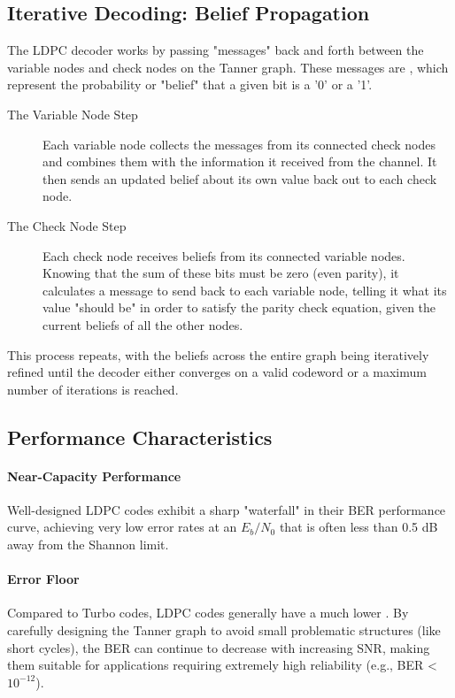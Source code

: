 \subsection{Iterative Decoding: Belief Propagation}

The LDPC decoder works by passing "messages" back and forth between the variable nodes and check nodes on the Tanner graph. These messages are , which represent the probability or "belief" that a given bit is a '0' or a '1'.
\begin{description}
    \item[The Variable Node Step] Each variable node collects the messages from its connected check nodes and combines them with the information it received from the channel. It then sends an updated belief about its own value back out to each check node.
    \item[The Check Node Step] Each check node receives beliefs from its connected variable nodes. Knowing that the sum of these bits must be zero (even parity), it calculates a message to send back to each variable node, telling it what its value "should be" in order to satisfy the parity check equation, given the current beliefs of all the other nodes.
\end{description}
This process repeats, with the beliefs across the entire graph being iteratively refined until the decoder either converges on a valid codeword or a maximum number of iterations is reached.


\subsection{Performance Characteristics}

\paragraph{Near-Capacity Performance}
Well-designed LDPC codes exhibit a sharp "waterfall" in their BER performance curve, achieving very low error rates at an $E_b/N_0$ that is often less than 0.5 dB away from the Shannon limit.

\paragraph{Error Floor}
Compared to Turbo codes, LDPC codes generally have a much lower . By carefully designing the Tanner graph to avoid small problematic structures (like short cycles), the BER can continue to decrease with increasing SNR, making them suitable for applications requiring extremely high reliability (e.g., BER < $10^{-12}$).

